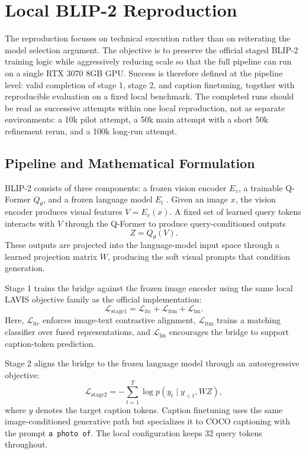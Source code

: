 \documentclass[11pt]{article}
\begin{document}
\section{Local BLIP-2 Reproduction}
The reproduction focuses on technical execution rather than on reiterating the model
selection argument. The objective is to preserve the official staged BLIP-2 training
logic while aggressively reducing scale so that the full pipeline can run on a single
RTX 3070 8GB GPU. Success is therefore defined at the pipeline level: valid completion
of stage 1, stage 2, and caption finetuning, together with reproducible evaluation on a
fixed local benchmark. The completed runs should be read as successive attempts within
one local reproduction, not as separate environments: a 10k pilot attempt, a 50k main
attempt with a short 50k refinement rerun, and a 100k long-run attempt.

\subsection{Pipeline and Mathematical Formulation}
BLIP-2 consists of three components: a frozen vision encoder $E_v$, a trainable
Q-Former $Q_\theta$, and a frozen language model $E_l$ \citep{li2023blip2}. Given an
image $x$, the vision encoder produces visual features $V = E_v(x)$. A fixed set of
learned query tokens interacts with $V$ through the Q-Former to produce
query-conditioned outputs
\[
Z = Q_\theta(V).
\]
These outputs are projected into the language-model input space through a learned
projection matrix $W$, producing the soft visual prompts that condition generation.

Stage 1 trains the bridge against the frozen image encoder using the same local LAVIS
objective family as the official implementation:
\[
\mathcal{L}_{\text{stage1}} =
\mathcal{L}_{\text{itc}} +
\mathcal{L}_{\text{itm}} +
\mathcal{L}_{\text{lm}}.
\]
Here, $\mathcal{L}_{\text{itc}}$ enforces image-text contrastive alignment,
$\mathcal{L}_{\text{itm}}$ trains a matching classifier over fused representations, and
$\mathcal{L}_{\text{lm}}$ encourages the bridge to support caption-token prediction.

Stage 2 aligns the bridge to the frozen language model through an autoregressive
objective:
\[
\mathcal{L}_{\text{stage2}} =
- \sum_{t=1}^{T} \log p(y_t \mid y_{<t}, WZ),
\]
where $y$ denotes the target caption tokens. Caption finetuning uses the same
image-conditioned generative path but specializes it to COCO captioning with the prompt
\texttt{a photo of}. The local configuration keeps 32 query tokens throughout.
\end{document}
